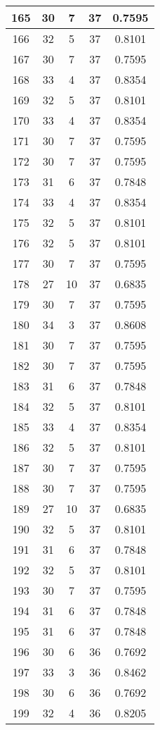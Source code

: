 \documentclass[letterpaper, 12pt]{article}
\begin{document}
\begin{longtable}{|c|c|c|c|c|}
\hline
165 & 30 & 7 & 37 & 0.7595 \\
\hline
166 & 32 & 5 & 37 & 0.8101 \\
\hline
167 & 30 & 7 & 37 & 0.7595 \\
\hline
168 & 33 & 4 & 37 & 0.8354 \\
\hline
169 & 32 & 5 & 37 & 0.8101 \\
\hline
170 & 33 & 4 & 37 & 0.8354 \\
\hline
171 & 30 & 7 & 37 & 0.7595 \\
\hline
172 & 30 & 7 & 37 & 0.7595 \\
\hline
173 & 31 & 6 & 37 & 0.7848 \\
\hline
174 & 33 & 4 & 37 & 0.8354 \\
\hline
175 & 32 & 5 & 37 & 0.8101 \\
\hline
176 & 32 & 5 & 37 & 0.8101 \\
\hline
177 & 30 & 7 & 37 & 0.7595 \\
\hline
178 & 27 & 10 & 37 & 0.6835 \\
\hline
179 & 30 & 7 & 37 & 0.7595 \\
\hline
180 & 34 & 3 & 37 & 0.8608 \\
\hline
181 & 30 & 7 & 37 & 0.7595 \\
\hline
182 & 30 & 7 & 37 & 0.7595 \\
\hline
183 & 31 & 6 & 37 & 0.7848 \\
\hline
184 & 32 & 5 & 37 & 0.8101 \\
\hline
185 & 33 & 4 & 37 & 0.8354 \\
\hline
186 & 32 & 5 & 37 & 0.8101 \\
\hline
187 & 30 & 7 & 37 & 0.7595 \\
\hline
188 & 30 & 7 & 37 & 0.7595 \\
\hline
189 & 27 & 10 & 37 & 0.6835 \\
\hline
190 & 32 & 5 & 37 & 0.8101 \\
\hline
191 & 31 & 6 & 37 & 0.7848 \\
\hline
192 & 32 & 5 & 37 & 0.8101 \\
\hline
193 & 30 & 7 & 37 & 0.7595 \\
\hline
194 & 31 & 6 & 37 & 0.7848 \\
\hline
195 & 31 & 6 & 37 & 0.7848 \\
\hline
196 & 30 & 6 & 36 & 0.7692 \\
\hline
197 & 33 & 3 & 36 & 0.8462 \\
\hline
198 & 30 & 6 & 36 & 0.7692 \\
\hline
199 & 32 & 4 & 36 & 0.8205 \\
\hline
\end{longtable}
\end{document}
